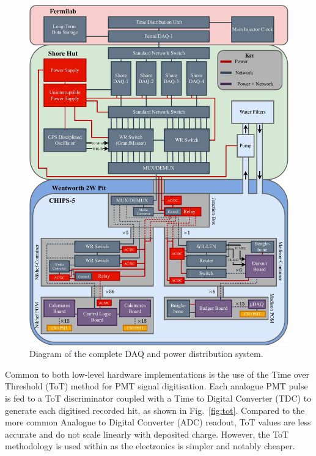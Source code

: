 \begin{figure} %
    \includegraphics[width=\textwidth]{diagrams/5-daq/daq.pdf}
    \caption[Diagram of the complete \chipsfive data acquisition and power distribution system.]
    {Diagram of the complete \chipsfive DAQ and power distribution system.}
    \label{fig:daq}
\end{figure}

Common to both low-level hardware implementations is the use of the Time over Threshold (ToT)
method for PMT signal digitisation. Each analogue PMT pulse is fed to a ToT discriminator coupled
with a Time to Digital Converter (TDC) to generate each digitised recorded hit, as shown in
Fig.~\ref{fig:tot}. Compared to the more common Analogue to Digital Converter (ADC) readout, ToT
values are less accurate and do not scale linearly with deposited charge. However, the ToT
methodology is used within \chips as the electronics is simpler and notably cheaper.

